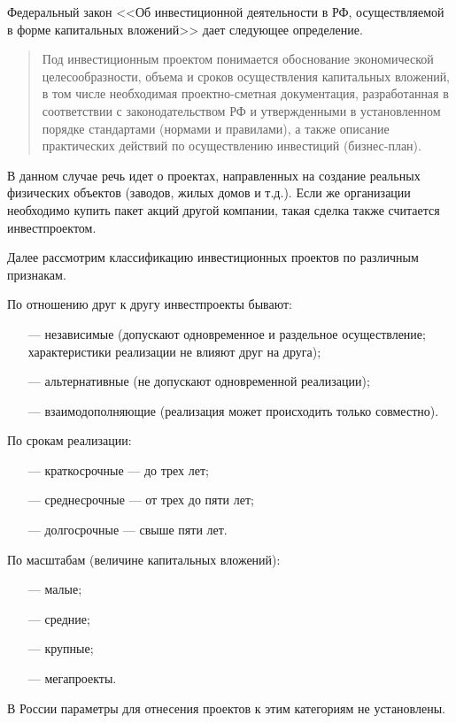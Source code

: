 Федеральный закон <<Об инвестиционной деятельности в РФ, осуществляемой в форме капитальных вложений>> \cite{39-fz} дает следующее определение.
\begin{quote}
	Под инвестиционным проектом понимается обоснование экономической целесообразности, объема и сроков осуществления капитальных вложений, в том числе необходимая проектно-сметная документация, разработанная в соответствии с законодательством РФ и утвержденными в установленном порядке стандартами (нормами и правилами), а также описание практических действий по осуществлению инвестиций (бизнес-план).
\end{quote}


В данном случае речь идет о проектах, направленных на создание реальных физических объектов (заводов, жилых домов и т.д.). Если же организации необходимо купить пакет акций другой компании, такая сделка также считается инвестпроектом.

Далее рассмотрим классификацию инвестиционных проектов по различным признакам.

По отношению друг к другу инвестпроекты бывают:
\begin{enumerate}
	\item [---] независимые (допускают одновременное и раздельное осуществление; характеристики реализации не влияют друг на друга);
	\item [---] альтернативные (не допускают одновременной реализации);
	\item [---] взаимодополняющие (реализация может происходить только совместно).
\end{enumerate}

По срокам реализации:
\begin{enumerate}
	\item [---] краткосрочные --- до трех лет;
	\item [---] среднесрочные --- от трех до пяти лет;
	\item [---] долгосрочные --- свыше пяти лет.
\end{enumerate}

По масштабам (величине капитальных вложений):
\begin{enumerate}
	\item [---] малые;
	\item [---] средние;
	\item [---] крупные;
	\item [---] мегапроекты.
\end{enumerate}

В России параметры для отнесения проектов к этим категориям не установлены.


